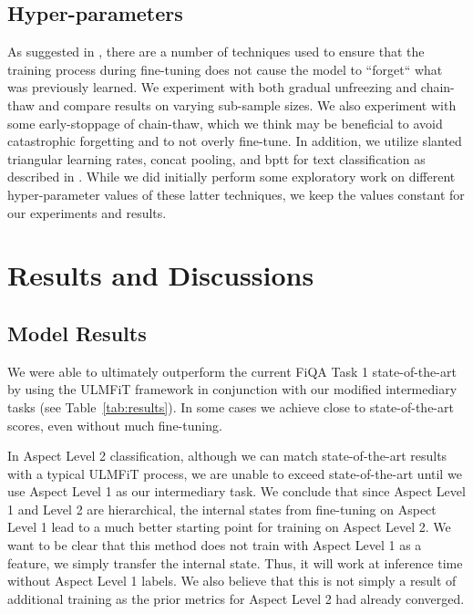 \documentclass[11pt,a4paper]{article}
\begin{document}
\subsection{Hyper-parameters}
As suggested in , there are a number of techniques used to ensure that the training process during fine-tuning does not cause the model to ``forget`` what was previously learned. We experiment with both gradual unfreezing  and chain-thaw  and compare results on varying sub-sample sizes. We also experiment with some early-stoppage of chain-thaw, which we think may be beneficial to avoid catastrophic forgetting and to not overly fine-tune. In addition, we utilize slanted triangular learning rates, concat pooling, and bptt for text classification as described in . While we did initially perform some exploratory work on different hyper-parameter values of these latter techniques, we keep the values constant for our experiments and results.

\begin{table*}
\texttt{[image: \{results3.png]}}
\caption{Test error rates and F1 scores for classification, test MSE and R2 for regression.}
\label{tab:results}
\end{table*}

\section{Results and Discussions}
\label{sec:results}

\subsection{Model Results}
\label{ssec:results}
We were able to ultimately outperform the current FiQA Task 1 state-of-the-art by using the ULMFiT framework in conjunction with our modified intermediary tasks (see Table~\ref{tab:results}). In some cases we achieve close to state-of-the-art scores, even without much fine-tuning.

In Aspect Level 2 classification, although we can match state-of-the-art results with a typical ULMFiT process, we are unable to exceed state-of-the-art until we use Aspect Level 1 as our intermediary task. We conclude that since Aspect Level 1 and Level 2 are hierarchical, the internal states from fine-tuning on Aspect Level 1 lead to a much better starting point for training on Aspect Level 2. We want to be clear that this method does not train with Aspect Level 1 as a feature, we simply transfer the internal state. Thus, it will work at inference time without Aspect Level 1 labels. We also believe that this is not simply a result of additional training as the prior metrics for Aspect Level 2 had already converged. 
\end{document}
